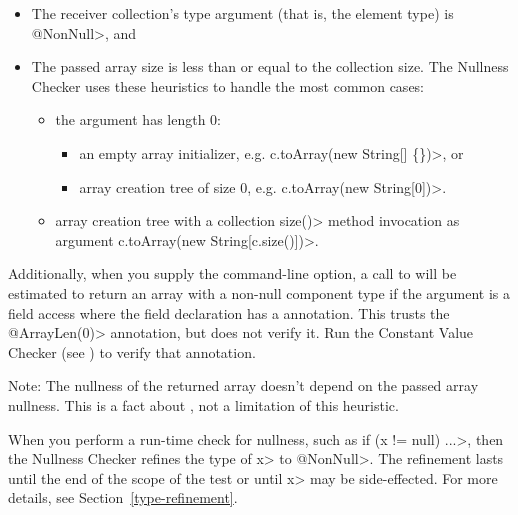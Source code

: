 \begin{itemize}
  \item The receiver collection's type argument (that is, the element type) is \<@NonNull>, and
  \item The passed array size is less than or equal to the collection size. The
    Nullness Checker uses these heuristics to handle the most common cases:

  \begin{itemize}
    \item the argument has length 0:

      \begin{itemize}
        \item an empty array initializer, e.g. \<c.toArray(new String[] \{\})>, or

        \item array creation tree of size 0, e.g. \<c.toArray(new String[0])>.
      \end{itemize}

    \item array creation tree with a collection \<size()> method invocation as argument
      \<c.toArray(new String[c.size()])>.
  \end{itemize}

\end{itemize}

Additionally, when you supply the  command-line
option, a call to  will be estimated to return an array
with a non-null component type if the argument is a field access where the field
declaration has a 
annotation.
This trusts the \<@ArrayLen(0)> annotation, but does not verify it. Run the
Constant Value Checker (see ) to verify
that annotation.

Note: The nullness of the returned array doesn't depend on the passed array nullness.
This is a fact about
,
not a limitation of this heuristic.



When you perform a run-time check for nullness, such as \<if (x != null)
...>, then the Nullness Checker refines the type of \<x> to
\<@NonNull>.  The refinement lasts until the end of the scope of the test
or until \<x> may be side-effected.  For more details, see
Section~\ref{type-refinement}.


